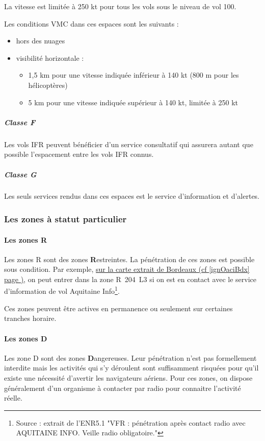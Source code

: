 				
		La vitesse est limitée à 250 kt pour tous les vols sous le niveau de vol 100.
		
		Les conditions VMC dans ces espaces sont les suivants :
		\begin{itemize}
			\item hors des nuages
			\item visibilité horizontale :
			\begin{itemize}
				\item 1,5 km pour une vitesse indiquée inférieur à 140 kt (800 m pour les hélicoptères)
				\item 5 km pour une vitesse indiquée supérieur à 140 kt, limitée à 250 kt
			\end{itemize}
		\end{itemize}
		
		\subparagraph{Classe F}
		Les vols IFR peuvent bénéficier d'un service consultatif qui assurera autant que possible l'espacement entre les vols IFR connus. 
		
		
		\subparagraph{Classe G}
		Les seuls services rendus dans ces espaces est le service d'information et d'alertes.
		
		
		\subsubsection{Les zones à statut particulier}
			\paragraph{Les zones R}
			Les zones R sont des zones \textbf{R}estreintes. La pénétration de ces zones est possible sous condition. Par exemple, \hyperlink{ignOaciBordeaux.1}{sur la carte extrait de Bordeaux (cf \ref{ignOaciBdx} page \pageref{ignOaciBdx})}, on peut entrer dans la zone R~204~L3 si on est en contact avec le service d'information de vol Aquitaine Info\footnote{Source : extrait de l'ENR5.1 "VFR : pénétration après contact radio avec AQUITAINE INFO. Veille radio obligatoire."}.
			
			Ces zones peuvent être actives en permanence ou seulement sur certaines tranches horaire.
			
			\paragraph{Les zones D}
			Les zone D sont des zones \textbf{D}angereuses. Leur pénétration n'est pas formellement interdite mais les activités qui s'y déroulent sont suffisamment risquées pour qu'il existe une nécessité d'avertir les navigateurs aériens. Pour ces zones, on dispose généralement d'un organisme à contacter par radio pour connaitre l'activité réelle.
			
